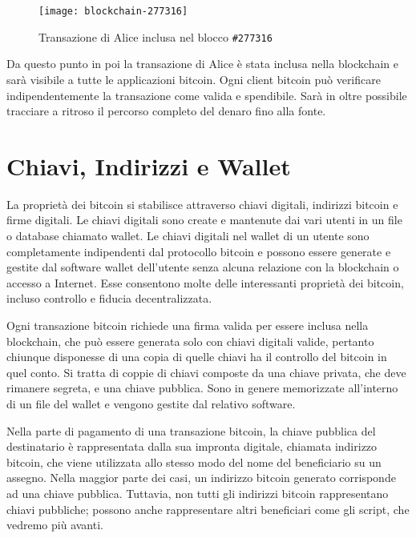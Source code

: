 \begin{figure}
	\centering 
	\texttt{[image: blockchain-277316]} 
	\caption[Transazione di Alice inclusa nel blocco \texttt{\#277316}]{Transazione di Alice inclusa nel blocco \texttt{\#277316}}
	\label{fig:blockchain-277316} 
\end{figure}
Da questo punto in poi la transazione di Alice è stata inclusa nella blockchain e sarà visibile a tutte le applicazioni bitcoin. Ogni client bitcoin può verificare indipendentemente la transazione come valida e spendibile. Sarà in oltre possibile tracciare a ritroso il percorso completo del denaro fino alla fonte.

\section{Chiavi, Indirizzi e Wallet}
La proprietà dei bitcoin si stabilisce attraverso chiavi digitali, indirizzi bitcoin e firme digitali. Le chiavi digitali sono create e mantenute dai vari utenti in un file o database chiamato wallet. Le chiavi digitali nel wallet di un utente sono completamente indipendenti dal protocollo bitcoin e possono essere generate e gestite dal software wallet dell'utente senza alcuna relazione con la blockchain o accesso a Internet. Esse consentono molte delle interessanti proprietà dei bitcoin, incluso controllo e fiducia decentralizzata.

Ogni transazione bitcoin richiede una firma valida per essere inclusa nella blockchain, che può essere generata solo con chiavi digitali valide, pertanto chiunque disponesse di una copia di quelle chiavi ha il controllo del bitcoin in quel conto. Si tratta di coppie di chiavi composte da una chiave privata, che deve rimanere segreta, e una chiave pubblica. Sono in genere memorizzate all'interno di un file del wallet e vengono gestite dal relativo software. 

Nella parte di pagamento di una transazione bitcoin, la chiave pubblica del destinatario è rappresentata dalla sua impronta digitale, chiamata indirizzo bitcoin, che viene utilizzata allo stesso modo del nome del beneficiario su un assegno. Nella maggior parte dei casi, un indirizzo bitcoin generato corrisponde ad una chiave pubblica. Tuttavia, non tutti gli indirizzi bitcoin rappresentano chiavi pubbliche; possono anche rappresentare altri beneficiari come gli script, che vedremo più avanti.

